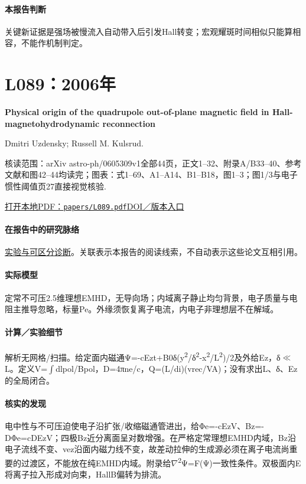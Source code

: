 \documentclass[UTF8,a4paper,11pt,openany,fontset=fandol]{ctexbook}
\begin{document}
\paragraph{本报告判断}关键新证据是强场被慢流入自动带入后引发Hall转变；宏观耀斑时间相似只能算相容，不能作机制判定。

\section{L089：2006年}\label{paper:L089}

\textbf{Physical origin of the quadrupole out-of-plane magnetic field in Hall-magnetohydrodynamic reconnection}\citep{L089}\

Dmitri Uzdensky;  Russell M. Kulsrud.

\textsf{核读范围：}arXiv astro-ph/0605309v1全部44页，正文1–32、附录A/B33–40、参考文献和图42–44均读完；\textsf{图表：}式1–69、A1–A14、B1–B18，图1–3；图1/3与电子惯性阈值页27直接视觉核验.

\href{run:../papers/L089.pdf}{打开本地PDF：\texttt{papers/L089.pdf}}\quad\href{https://doi.org/10.1063/1.2209627}{DOI／版本入口}

\paragraph{在报告中的研究脉络}\hyperref[story:diagnostic]{实验与可区分诊断}。关联表示本报告的阅读线索，不自动表示这些论文互相引用。

\paragraph{实际模型}定常不可压2.5维理想EMHD，无导向场；内域离子静止均匀背景，电子质量与电阻主推导忽略，标量Pe。外缘须恢复离子电流，内电子非理想层不在解域。

\paragraph{计算／实验细节}解析无网格/扫描。给定面内磁通Ψ=-cEzt+B0δ(y\textsuperscript{2}/δ\textsuperscript{2}-x\textsuperscript{2}/L\textsuperscript{2})/2及外给Ez，δ\ensuremath{\ll}L。定义V=\ensuremath{\int}dlpol/Bpol，D=4πne/c，Q=(L/di)(vrec/VA)；没有求出L、δ、Ez的全局闭合。

\paragraph{核实的发现}电中性与不可压迫使电子沿扩张/收缩磁通管进出，给Φe=-cEzV、Bz=-DΦe=cDEzV；四极Bz近分离面呈对数增强。在严格定常理想EMHD内域，Bz沿电子流线不变、vez沿面内磁力线不变，故差动拉伸的生成源必须在离子电流尚重要的过渡区，不能放在纯EMHD内域。附录给\ensuremath{\nabla}\textsuperscript{2}Ψ=F(Ψ)一致性条件。双极面内E将离子拉入形成对向束，HallB偏转为排流。
\end{document}
